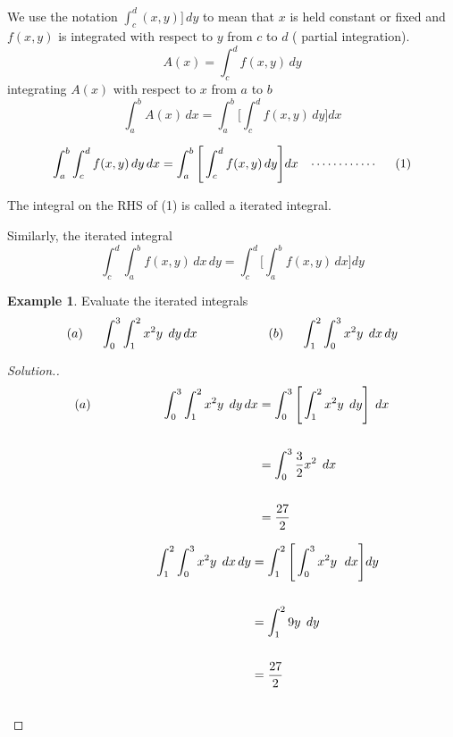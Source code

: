 \documentclass[11pt,a4paper]{article}
\theoremstyle{definition}
\newtheorem{exa}[thm]{Example}
\newenvironment{solution}
  {\renewcommand{\qedsymbol}{}\begin{proof}[\textit{Solution}.]}
  {\end{proof}}
\begin{document}
We use the notation $\displaystyle{\int^d_c(x,y)]\,dy}$ to mean that $x$ is held constant or fixed and $f(x,y)$ is integrated with respect to $y$ from $c$ to $d$ ( partial integration). $$A(x) = \int^d_c f(x,y)\, dy$$
integrating $A(x)$ with respect to $x$ from $a$ to $b$ 
$$\int^b_a A(x)\, dx = \int^b_a \Bigg[\int^d_c f(x,y)\, dy \Bigg] dx$$

$$\int^b_a\int^d_c f(x,y)\,dy\,dx = \int^b_a\Bigg[ \int^d_c f(x,y)\,dy\Bigg] dx\hspace{0.3cm} \cdots\cdots\cdots\cdots\hspace{0.5cm} (1)$$

The integral on the RHS of (1) is called a iterated integral.


Similarly, the iterated integral 
$$\int^d_c\int^b_a f(x,y)\,dx\,dy = \int^d_c\Bigg[ \int^b_a f(x,y)\,dx\Bigg] dy$$


\begin{exa}


Evaluate the iterated integrals $$(a)\hspace{0.5cm} \int^3_0\int^2_1 x^2y\hspace{0.1cm} \,dy\,dx\hspace{2cm} (b)\hspace{0.5cm} \int^2_1\int^3_0 x^2y\,\hspace{0.1cm} dx\,dy$$
\end{exa}


\begin{solution}
\begin{align*}
(a)\hspace{2cm} \int^3_0\int^2_1 x^2y\hspace{0.1cm} \,dy\,dx & = \int^3_0\Bigg[ \int^2_1 x^2y\hspace{0.1cm} \,dy\Bigg]\hspace{0.1cm} \,dx\\\\
& = \int^3_0\frac{3}{2}x^2\hspace{0.1cm}\, dx\\\\
& = \frac{27}{2}\\
\end{align*}

\begin{align*}
 \hspace{2cm} \int^2_1\int^3_0 x^2y\hspace{0.1cm}\, dx\, dy & =  \int^2_1\Bigg[ \int^3_0 x^2y\,\hspace{0.1cm}\, dx\Bigg] dy\\\\
 &  = \int^2_1 9y\hspace{0.1cm}\, dy\\\\
 & = \frac{27}{2}\\\\
\end{align*}
\end{solution}
\end{document}
